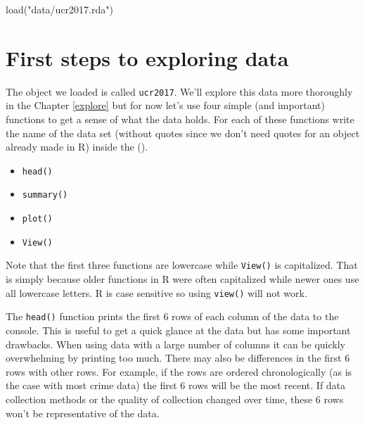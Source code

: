 \documentclass[
  12pt,
  openany]{book}
\newenvironment{Shaded}{\begin{snugshade}}{\end{snugshade}}
\newcommand{\FunctionTok}[1]{\textcolor[rgb]{0,0,0}{#1}}
\newcommand{\NormalTok}[1]{#1}
\newcommand{\StringTok}[1]{\textcolor[rgb]{0.5,0.5,0.5}{#1}}
\providecommand{\tightlist}{%
  \setlength{\itemsep}{0pt}\setlength{\parskip}{0pt}}
\begin{document}
\begin{Shaded}
\begin{Highlighting}[]
\FunctionTok{load}\NormalTok{(}\StringTok{"data/ucr2017.rda"}\NormalTok{)}
\end{Highlighting}
\end{Shaded}

\hypertarget{first-steps-to-exploring-data}{%
\section{First steps to exploring data}\label{first-steps-to-exploring-data}}

The object we loaded is called \texttt{ucr2017}. We'll explore this data more thoroughly in the Chapter \ref{explore} but for now let's use four simple (and important) functions to get a sense of what the data holds. For each of these functions write the name of the data set (without quotes since we don't need quotes for an object already made in R) inside the ().

\begin{itemize}
\tightlist
\item
  \texttt{head()}
\item
  \texttt{summary()}
\item
  \texttt{plot()}
\item
  \texttt{View()}
\end{itemize}

Note that the first three functions are lowercase while \texttt{View()} is capitalized. That is simply because older functions in R were often capitalized while newer ones use all lowercase letters. R is case sensitive so using \texttt{view()} will not work.

The \texttt{head()} function prints the first 6 rows of each column of the data to the console. This is useful to get a quick glance at the data but has some important drawbacks. When using data with a large number of columns it can be quickly overwhelming by printing too much. There may also be differences in the first 6 rows with other rows. For example, if the rows are ordered chronologically (as is the case with most crime data) the first 6 rows will be the most recent. If data collection methods or the quality of collection changed over time, these 6 rows won't be representative of the data.
\end{document}
